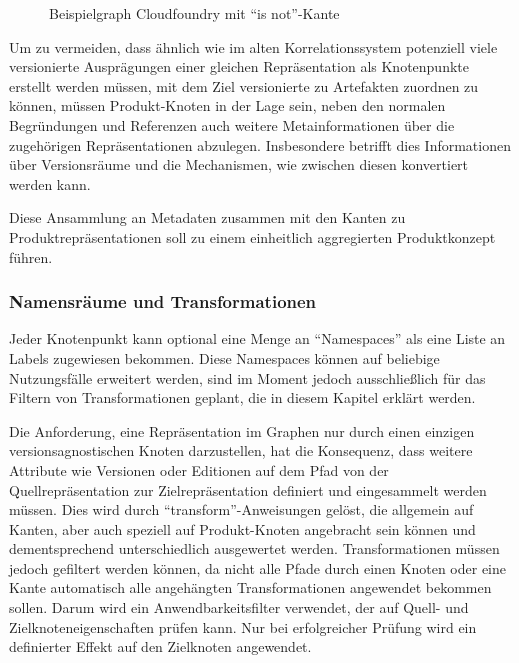 \begin{figure}[htbp]
    \centering
    \makebox[\textwidth]{}
    \caption{Beispielgraph Cloudfoundry mit \enquote{is not}-Kante}
    \label{fig:example-graph-cloudfoundry}
\end{figure}

Um zu vermeiden, dass ähnlich wie im alten Korrelationssystem potenziell viele versionierte Ausprägungen einer gleichen Repräsentation als Knotenpunkte erstellt werden müssen, mit dem Ziel versionierte  zu Artefakten zuordnen zu können, müssen Produkt-Knoten in der Lage sein, neben den normalen Begründungen und Referenzen auch weitere Metainformationen über die zugehörigen Repräsentationen abzulegen.
Insbesondere betrifft dies Informationen über Versionsräume und die Mechanismen, wie zwischen diesen konvertiert werden kann.

Diese Ansammlung an Metadaten zusammen mit den Kanten zu Produktrepräsentationen soll zu einem einheitlich aggregierten Produktkonzept führen.

\subsubsection{Namensräume und Transformationen}\label{subsubsec:model-namespaces-transformations}

Jeder Knotenpunkt kann optional eine Menge an \enquote{Namespaces} als eine Liste an Labels zugewiesen bekommen.
Diese Namespaces können auf beliebige Nutzungsfälle erweitert werden, sind im Moment jedoch ausschließlich für das Filtern von Transformationen geplant, die in diesem Kapitel erklärt werden.

Die Anforderung, eine Repräsentation im Graphen nur durch einen einzigen versionsagnostischen Knoten darzustellen, hat die Konsequenz, dass weitere Attribute wie Versionen oder Editionen auf dem Pfad von der Quellrepräsentation zur Zielrepräsentation definiert und eingesammelt werden müssen.
Dies wird durch \enquote{transform}-Anweisungen gelöst, die allgemein auf Kanten, aber auch speziell auf Produkt-Knoten angebracht sein können und dementsprechend unterschiedlich ausgewertet werden.
Transformationen müssen jedoch gefiltert werden können, da nicht alle Pfade durch einen Knoten oder eine Kante automatisch alle angehängten Transformationen angewendet bekommen sollen.
Darum wird ein Anwendbarkeitsfilter verwendet, der auf Quell- und Zielknoteneigenschaften prüfen kann.
Nur bei erfolgreicher Prüfung wird ein definierter Effekt auf den Zielknoten angewendet.


